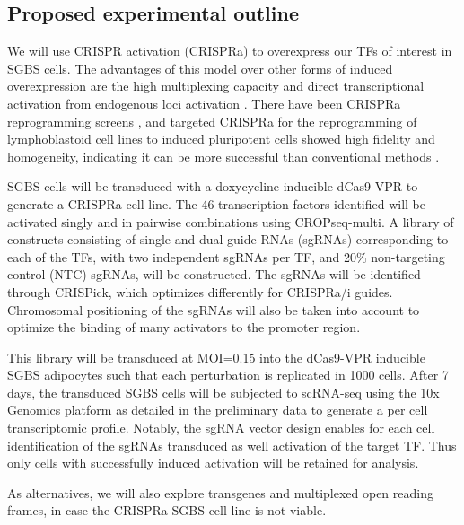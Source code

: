 \subsection{Proposed experimental outline}
We will use CRISPR activation (CRISPRa) to overexpress our TFs of interest in SGBS cells. The advantages of this model over other forms of induced overexpression are the high multiplexing capacity and direct transcriptional activation from endogenous loci activation \cite{Sokka2022-ax}. There have been CRISPRa reprogramming screens \cite{Yang2019-wd,Liu2018-fc}, and targeted CRISPRa for the reprogramming of lymphoblastoid cell lines to induced pluripotent cells showed high fidelity and homogeneity, indicating it can be more successful than conventional methods \cite{Sokka2022-ax}.   

SGBS cells will be transduced with a doxycycline-inducible dCas9-VPR to generate a CRISPRa cell line. The 46 transcription factors identified will be activated singly and in pairwise combinations using CROPseq-multi\cite{Walton2024-xj}. A library of constructs consisting of single and dual guide RNAs (sgRNAs) corresponding to each of the TFs, with two independent sgRNAs per TF, and 20\% non-targeting control (NTC) sgRNAs, will be constructed. The sgRNAs will be identified through CRISPick, which optimizes differently for CRISPRa/i guides\cite{Sanson2018-bh,Doench2016-bp}. Chromosomal positioning of the sgRNAs will also be taken into account to optimize the binding of many activators to the promoter region.   

This library will be transduced at MOI=0.15 into the dCas9-VPR inducible SGBS adipocytes such that each perturbation is replicated in 1000 cells. After 7 days, the transduced SGBS cells will be subjected to scRNA-seq using the 10x Genomics platform as detailed in the preliminary data to generate a per cell transcriptomic profile. Notably, the sgRNA vector design enables for each cell identification of the sgRNAs transduced as well activation of the target TF. Thus only cells with successfully induced activation will be retained for analysis\cite{Walton2024-xj}.   

As alternatives, we will also explore transgenes and multiplexed open reading frames, in case the CRISPRa SGBS cell line is not viable\cite{Joung2023-ft}.


